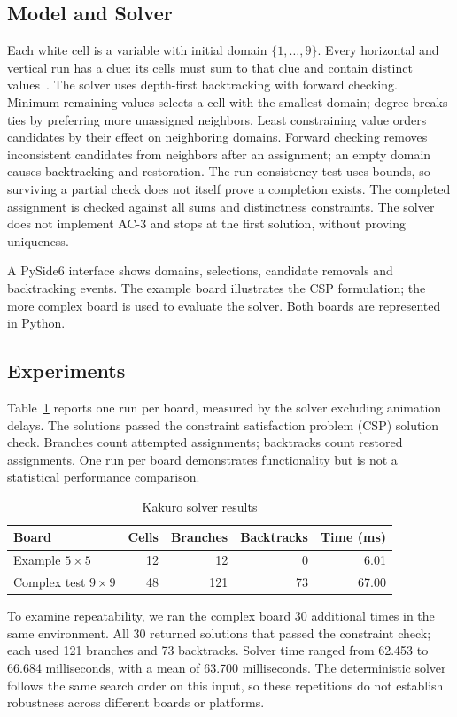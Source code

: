 \documentclass[conference]{IEEEtran}
\begin{document}
\subsection{Model and Solver}
Each white cell is a variable with initial domain \(\{1,\ldots,9\}\). Every horizontal and vertical run has a clue: its cells must sum to that clue and contain distinct values~\cite{kakuro}. The solver uses depth-first backtracking with forward checking. Minimum remaining values selects a cell with the smallest domain; degree breaks ties by preferring more unassigned neighbors. Least constraining value orders candidates by their effect on neighboring domains. Forward checking removes inconsistent candidates from neighbors after an assignment; an empty domain causes backtracking and restoration. The run consistency test uses bounds, so surviving a partial check does not itself prove a completion exists. The completed assignment is checked against all sums and distinctness constraints. The solver does not implement AC-3 and stops at the first solution, without proving uniqueness.

A PySide6 interface shows domains, selections, candidate removals and backtracking events. The example board illustrates the CSP formulation; the more complex board is used to evaluate the solver. Both boards are represented in Python.
\subsection{Experiments}
Table~\ref{kakuroresults} reports one run per board, measured by the solver excluding animation delays. The solutions passed the constraint satisfaction problem (CSP) solution check. Branches count attempted assignments; backtracks count restored assignments. One run per board demonstrates functionality but is not a statistical performance comparison.
\begin{table}[htbp]\caption{Kakuro solver results}\label{kakuroresults}\centering
    \begin{tabular}{lrrrr}\hline Board & Cells & Branches & Backtracks & Time (ms) \\\hline
                   Example \(5\times5\)     & 12    & 12       & 0          & 6.01      \\Complex test \(9\times9\) & 48 & 121 & 73 & 67.00\\\hline\end{tabular}\end{table}

To examine repeatability, we ran the complex board 30 additional times in the same environment. All 30 returned solutions that passed the constraint check; each used 121 branches and 73 backtracks. Solver time ranged from 62.453 to 66.684 milliseconds, with a mean of 63.700 milliseconds. The deterministic solver follows the same search order on this input, so these repetitions do not establish robustness across different boards or platforms.
\end{document}
